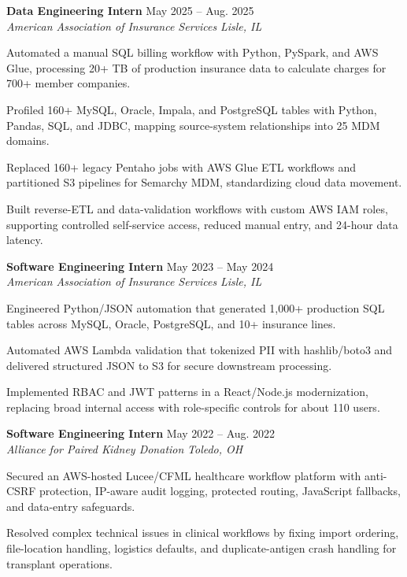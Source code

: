 \documentclass[letterpaper,11pt]{article}
\newcommand{\resumeSubheading}[4]{
  \textbf{#1} \hfill #2\\
  \textit{#3} \hfill \textit{#4}
}
\begin{document}
\resumeSubheading
{Data Engineering Intern}{May 2025 -- Aug. 2025}
{American Association of Insurance Services}{Lisle, IL}
\begin{tightitemize}
  \item Automated a manual SQL billing workflow with Python, PySpark, and AWS Glue, processing 20+ TB of production insurance data to calculate charges for 700+ member companies.
  \item Profiled 160+ MySQL, Oracle, Impala, and PostgreSQL tables with Python, Pandas, SQL, and JDBC, mapping source-system relationships into 25 MDM domains.
  \item Replaced 160+ legacy Pentaho jobs with AWS Glue ETL workflows and partitioned S3 pipelines for Semarchy MDM, standardizing cloud data movement.
  \item Built reverse-ETL and data-validation workflows with custom AWS IAM roles, supporting controlled self-service access, reduced manual entry, and 24-hour data latency.
\end{tightitemize}

\resumeSubheading
{Software Engineering Intern}{May 2023 -- May 2024}
{American Association of Insurance Services}{Lisle, IL}
\begin{tightitemize}
  \item Engineered Python/JSON automation that generated 1,000+ production SQL tables across MySQL, Oracle, PostgreSQL, and 10+ insurance lines.
  \item Automated AWS Lambda validation that tokenized PII with hashlib/boto3 and delivered structured JSON to S3 for secure downstream processing.
  \item Implemented RBAC and JWT patterns in a React/Node.js modernization, replacing broad internal access with role-specific controls for about 110 users.
\end{tightitemize}

\resumeSubheading
{Software Engineering Intern}{May 2022 -- Aug. 2022}
{Alliance for Paired Kidney Donation}{Toledo, OH}
\begin{tightitemize}
  \item Secured an AWS-hosted Lucee/CFML healthcare workflow platform with anti-CSRF protection, IP-aware audit logging, protected routing, JavaScript fallbacks, and data-entry safeguards.
  \item Resolved complex technical issues in clinical workflows by fixing import ordering, file-location handling, logistics defaults, and duplicate-antigen crash handling for transplant operations.
\end{tightitemize}
\end{document}
